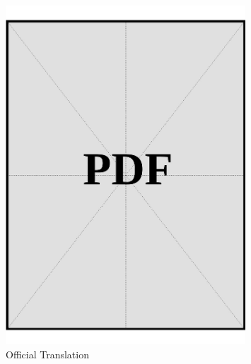 \begin{figure}[ht]
  \centering
  \includegraphics[page=1, width=0.8\textwidth]{../docs/applicant/employment/company-2/insurance-records/official-translations.pdf}
  \caption{Official Translation}
  \label{pdf:company-2-insurance-official-translations}
\end{figure}

\clearpage

\vspace*{\fill}

